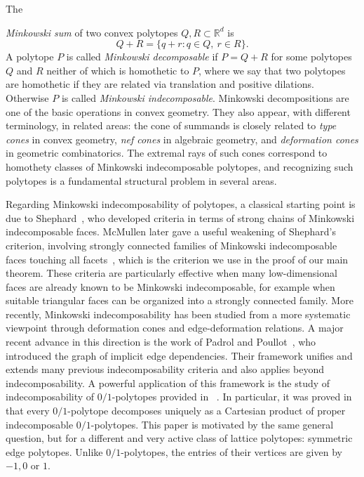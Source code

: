 \documentclass[11pt,a4paper]{amsart}
\theoremstyle{definition}
\theoremstyle{remark}
\newcommand{\RR}{\mathbb R}
\begin{document}
The {\emph{Minkowski sum} of two convex polytopes $Q,R\subset \RR^d$ is
\[
  Q+R=\{q+r:q\in Q,\ r\in R\}.
\]
A polytope $P$ is called \emph{Minkowski decomposable} if $P=Q+R$ for some polytopes $Q$ and $R$ neither of which is homothetic to $P$, 
where we say that two polytopes are homothetic if they are related via translation and positive dilations. 
Otherwise $P$ is called \emph{Minkowski indecomposable}. 
Minkowski decompositions are one of the basic operations in convex geometry. 
They also appear, with different terminology, in related areas: the cone of summands is closely related to \emph{type cones} in convex geometry, 
\emph{nef cones} in algebraic geometry, and \emph{deformation cones} in geometric combinatorics. 
The extremal rays of such cones correspond to homothety classes of Minkowski indecomposable polytopes, 
and recognizing such polytopes is a fundamental structural problem in several areas. 

Regarding Minkowski indecomposability of polytopes, a classical starting point is due to Shephard~\cite{Shephard1963}, 
who developed criteria in terms of strong chains of Minkowski indecomposable faces. 
McMullen later gave a useful weakening of Shephard's criterion, involving strongly connected families of Minkowski indecomposable faces touching all facets~\cite{McM}, 
which is the criterion we use in the proof of our main theorem. 
These criteria are particularly effective when many low-dimensional faces are already known to be Minkowski indecomposable, 
for example when suitable triangular faces can be organized into a strongly connected family. 
More recently, Minkowski indecomposability has been studied from a more systematic viewpoint through deformation cones and edge-deformation relations. 
A major recent advance in this direction is the work of Padrol and Poullot~\cite{PP}, who introduced the graph of implicit edge dependencies. 
Their framework unifies and extends many previous indecomposability criteria and also applies beyond indecomposability. 
A powerful application of this framework is the study of indecomposability of $0/1$-polytopes provided in ~\cite{HPS}. 
In particular, it was proved in~\cite{HPS} that every $0/1$-polytope decomposes uniquely as a Cartesian product of proper indecomposable $0/1$-polytopes. 
This paper is motivated by the same general question, but for a different and very active class of lattice polytopes: symmetric edge polytopes. 
Unlike $0/1$-polytopes, the entries of their vertices are given by $-1,0$ or $1$. 

}
\end{document}

